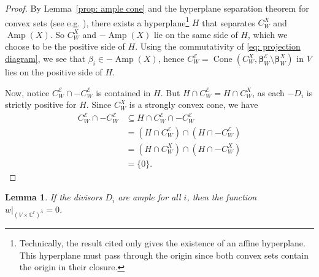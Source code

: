 \documentclass[reqno, 12pt]{amsart}
\newtheorem{lemma}[theorem]{Lemma}
\theoremstyle{definition}
\newcommand{\op}[1]{\operatorname{#1}}
\newcommand{\modmod}[1]{/ \! \! / \!_{#1}}
\newcommand{\tyler}[1]{{\color{blue} \sf TK: [#1]}}
\def\A{\op{\mathbb{A}}}
\def\Gm{\op{\mathbb{G}_m}}
\newcommand{\Amp}{\operatorname{Amp}}
\newcommand{\Cone}{\operatorname{Cone}}
\numberwithin{equation}{section}
\begin{document}
\begin{proof}
By Lemma~\ref{prop: ample cone} and the hyperplane separation theorem for convex sets (see e.g. \cite[3.4]{Klee}), there exists a hyperplane\footnote{Technically, the result cited only gives the existence of an affine hyperplane. This hyperplane must pass through the origin since both convex sets contain the origin in their closure.}
$H$ that separates $C^X_W$ and $\Amp(X)$. So $C^X_W$ and $-\Amp(X)$ lie on the same side of $H$, which we choose to be the positive side of $H$. Using the commutativity of \eqref{eq: projection diagram}, we see that $\beta_i \in - \Amp(X)$, hence $C^{\mathcal E}_W = \Cone(C^X_W, \boldsymbol{\beta}^{\mathcal{E}}_W \setminus \boldsymbol{\beta}^X_W)$ in $V$ lies on the positive side of $H$. %

Now, notice $C^{\mathcal E}_W \cap -C^{\mathcal E}_W$ is contained in $H$. But $H \cap C^{\mathcal E}_W = H \cap C^X_W$, as each $-D_i$ is strictly positive for $H$. Since $C^X_W$ is a strongly convex cone, we have 
\begin{align*}
C^{\mathcal E}_W \cap -C^{\mathcal E}_W &\subseteq H \cap C^{\mathcal E}_W \cap -C^{\mathcal E}_W \\
& = (H \cap C^{\mathcal E}_W) \cap (H \cap -C^{\mathcal E}_W) \\
& = (H \cap C^X_W) \cap (H \cap - C^X_W) \\ 
& = \{0\}.
\end{align*}
\end{proof}


\begin{lemma} \label{lem: w=0}
If the divisors $D_i$ are ample for all $i$, then the function $w|_{(V \times \mathbb C^r)^\lambda}=0$. 
\end{lemma}
\end{document}
